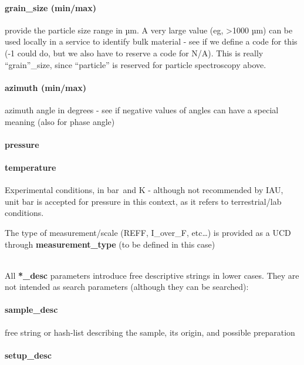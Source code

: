 \documentclass[11pt,a4paper]{ivoa}
\begin{document}
\paragraph{grain\_size (min/max)}

provide the particle size range in µm. A very large value (eg, >1000 µm) can be used locally in a service to identify bulk material - see if we define a code for this (-1 could do, but we also have to reserve a code for N/A). This is really ``grain''\_size, since ``particle'' is reserved for particle spectroscopy above.\\

\paragraph{azimuth (min/max)}

azimuth angle in degrees - see if negative values of angles can have a special meaning (also for phase angle)

\paragraph{pressure}

\paragraph{temperature}

Experimental conditions, in bar and K - although not recommended by IAU, unit bar is accepted for pressure in this context, as it refers to terrestrial/lab conditions.

The type of measurement/scale (REFF, I\_over\_F, etc…) is provided as a UCD through \textbf{measurement\_type} (to be defined in this case)

\\

All \textbf{*\_desc} parameters introduce free descriptive strings in lower cases. They are not intended as search parameters (although they can be searched):

\paragraph{sample\_desc}

free string or hash-list describing the sample, its origin, and possible preparation

\paragraph{setup\_desc}
\end{document}
